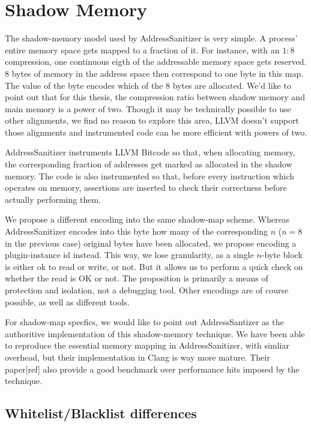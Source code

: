 \chapter {Shadow Memory}

The shadow-memory model used by AddressSanitizer is very simple. A process'
entire memory space gets mapped to a fraction of it. For instance, with an $1:8$
compression, one continuous eigth of the addressable memory space gets reserved.
8 bytes of memory in the address space then correspond to one byte in this
map. The value of the byte encodes which of the 8 bytes are allocated. We'd like
to point out that for this thesis, the compression ratio between shadow memory
and main memory is a power of two. Though it may be technically possible to use
other alignments, we find no reason to explore this area, LLVM doesn't support
those alignments and instrumented code can be more efficient with powers of two.

AddressSanitizer instruments LLVM Bitcode so that, when allocating memory, the
corresponding fraction of addresses get marked as allocated in the shadow
memory. The code is also instrumented so that, before every instruction which
operates on memory, assertions are inserted to check their correctness before
actually performing them.

We propose a different encoding into the same shadow-map scheme. Whereas
AddressSanitizer encodes into this byte how many of the corresponding $n$
($n = 8$ in the previous case) original bytes have been allocated, we propose
encoding a plugin-instance id instead. This way, we lose granularity, as a
single $n$-byte block is either ok to read or write, or not. But it allows us to
perform a quick check on whether the read is OK or not. The proposition is
primarily a means of protection and isolation, not a debugging tool. Other
encodings are of course possible, as well as different tools.

For shadow-map specfics, we would like to point out AddressSantizer as the
authoritive implementation of this shadow-memory technique. We have been able to
reproduce the essential memory mapping in AddressSanitizer, with simliar
overhead, but their implementation in Clang is way more mature. Their
paper[ref] also provide a good benchmark over performance hits imposed by the
technique.


\section {Whitelist/Blacklist differences}

